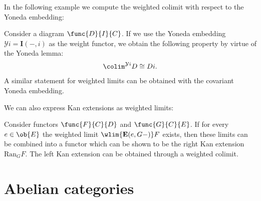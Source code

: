     In the following example we compute the weighted colimit with respect to the Yoneda embedding:
    \begin{example}
        Consider a diagram $\func{D}{I}{C}$. If we use the Yoneda embedding $\mathcal{Y}i = \mathbf{I}(-, i)$ as the weight functor, we obtain the following property by virtue of the Yoneda lemma:
        \begin{gather}
            \label{cat:weighted_hom_colimit}
            \colim^{\mathcal{Y}i}D\cong Di.
        \end{gather}
        A similar statement for weighted limits can be obtained with the covariant Yoneda embedding.
    \end{example}

    We can also express Kan extensions as weighted limits:
    \begin{property}
        Consider functors $\func{F}{C}{D}$ and $\func{G}{C}{E}$. If for every $e\in\ob{E}$ the weighted limit $\wlim{\mathbf{E}(e, G-)}F$ exists, then these limits can be combined into a functor which can be shown to be the right Kan extension $\text{Ran}_GF$. The left Kan extension can be obtained through a weighted colimit.
    \end{property}

\section{Abelian categories}\label{section:abelian_categories}


